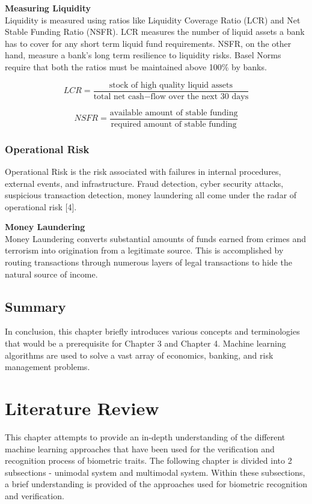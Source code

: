\documentclass[a4paper, 12pt]{article}
\begin{document}
\vskip 0.2in
\noindent\textbf{Measuring Liquidity} \\
\noindent Liquidity is measured using ratios like Liquidity Coverage Ratio (LCR) and Net Stable Funding Ratio (NSFR). LCR measures the number of liquid assets a bank has to cover for any short term liquid fund requirements. NSFR, on the other hand, measure a bank's long term resilience to liquidity risks. Basel Norms require that both the ratios must be maintained above 100\% by banks.

\begin{equation}
    LCR = \frac{\text{stock of high quality liquid assets}}{\text{total net cash} - \text{flow over the next 30 days}}
\end{equation}

\begin{equation}
    NSFR = \frac{\text{available amount of stable funding}}{\text{required amount of stable funding}}
\end{equation}

\vskip 0.2in
\subsubsection{Operational Risk}
\noindent Operational Risk is the risk associated with failures in internal procedures, external events, and infrastructure. Fraud detection, cyber security attacks, suspicious transaction detection, money laundering all come under the radar of operational risk [4].

\vskip 0.2in
\noindent\textbf{Money Laundering} \\
\noindent Money Laundering converts substantial amounts of funds earned from crimes and terrorism into origination from a legitimate source. This is accomplished by routing transactions through numerous layers of legal transactions to hide the natural source of income.

\vskip 0.2in
\subsection{Summary}
In conclusion, this chapter briefly introduces various concepts and terminologies that would be a prerequisite for Chapter 3 and Chapter 4. Machine learning algorithms are used to solve a vast array of economics, banking, and risk management problems.

\newpage
\section{\centering Literature Review}
\vskip 0.25in
This chapter attempts to provide an in-depth understanding of the different machine learning approaches that have been used for the verification and recognition process of biometric traits. The following chapter is divided into 2 subsections - unimodal system and multimodal system. Within these subsections, a brief understanding is provided of the approaches used for biometric recognition and verification.
\vskip 0.2in
\end{document}
